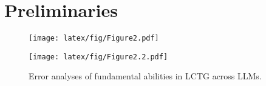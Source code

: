 
\section{Preliminaries}
\label{sec:Preliminaries}

\begin{figure*}[t]
    \centering
    
    \begin{minipage}[b]{0.46\textwidth}
        \centering        \texttt{[image: latex/fig/Figure2.pdf]}
        \vspace*{-5pt} %
    \end{minipage}
    \hfill
    \begin{minipage}[b]{0.53\textwidth}
        \centering
        \texttt{[image: latex/fig/Figure2.2.pdf]}
        \vspace*{-5pt}
    \end{minipage}
    
    \caption{Error analyses of fundamental abilities in LCTG across LLMs. }
    \label{fig:figure2}
    \vspace{-3mm} %
\end{figure*}



